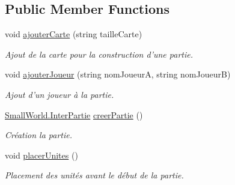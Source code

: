 \subsection*{Public Member Functions}
\begin{DoxyCompactItemize}
\item 
void \hyperlink{class_small_world_1_1_monteur_partie_a5d8bf6c04f12b46961962f5cff455b77}{ajouter\-Carte} (string taille\-Carte)
\begin{DoxyCompactList}\small\item\em Ajout de la carte pour la construction d'une partie. \end{DoxyCompactList}\item 
void \hyperlink{class_small_world_1_1_monteur_partie_a4b08bbb3c398ac0f1e1fa49510df20bc}{ajouter\-Joueur} (string nom\-Joueur\-A, string nom\-Joueur\-B)
\begin{DoxyCompactList}\small\item\em Ajout d'un joueur à la partie. \end{DoxyCompactList}\item 
\hypertarget{class_small_world_1_1_monteur_partie_a851827aafea56d71083ee189d5743fa9}{\hyperlink{interface_small_world_1_1_inter_partie}{Small\-World.\-Inter\-Partie} \hyperlink{class_small_world_1_1_monteur_partie_a851827aafea56d71083ee189d5743fa9}{creer\-Partie} ()}\label{class_small_world_1_1_monteur_partie_a851827aafea56d71083ee189d5743fa9}

\begin{DoxyCompactList}\small\item\em Création la partie. \end{DoxyCompactList}\item 
\hypertarget{class_small_world_1_1_monteur_partie_a0f15d1583b4289efb1ed7e9bba11d897}{void \hyperlink{class_small_world_1_1_monteur_partie_a0f15d1583b4289efb1ed7e9bba11d897}{placer\-Unites} ()}\label{class_small_world_1_1_monteur_partie_a0f15d1583b4289efb1ed7e9bba11d897}

\begin{DoxyCompactList}\small\item\em Placement des unités avant le début de la partie. \end{DoxyCompactList}\end{DoxyCompactItemize}
